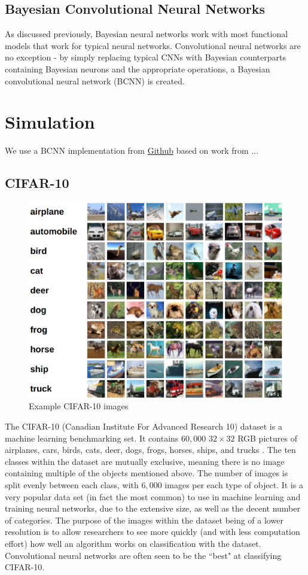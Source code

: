 \documentclass[12pt]{article}
\begin{document}
\subsection{Bayesian Convolutional Neural Networks}

As discussed previously, Bayesian neural networks work with most functional models that work for typical neural networks. Convolutional neural networks are no exception - by simply replacing typical CNNs with Bayesian counterparts containing Bayesian neurons and the appropriate operations, a Bayesian convolutional neural network (BCNN) is created. 

\section{Simulation}

We use a BCNN implementation from \href{https://github.com/kumar-shridhar/PyTorch-BayesianCNN}{Github} based on work from ... \cite{shridhar2019comprehensive} \cite{shridhar2018uncertainty}

\subsection{CIFAR-10}

	\begin{figure}[H]
		\centering
	\includegraphics[width=.75\textwidth]{../Images/cifar-10.png}
	\caption{Example CIFAR-10 images \cite{cifar10}}
\end{figure}

The CIFAR-10 (Canadian Institute For Advanced Research 10) dataset is a machine learning benchmarking set. It contains $60,000$ $32 \times 32$ RGB pictures of airplanes, cars, birds, cats, deer, dogs, frogs, horses, ships, and trucks \cite{cifar10}. The ten classes within the dataset are mutually exclusive, meaning there is no image containing multiple of the objects mentioned above. The number of images is split evenly between each class, with $6,000$ images per each type of object. It is a very popular data set (in fact the most common) to use in machine learning and training neural networks, due to the extensive size, as well as the decent number of categories. The purpose of the images within the dataset being of a lower resolution is to allow researchers to see more quickly (and with less computation effort) how well an algorithm works on classification with the dataset. Convolutional neural networks are often seen to be the ``best" at classifying CIFAR-10.
\end{document}
